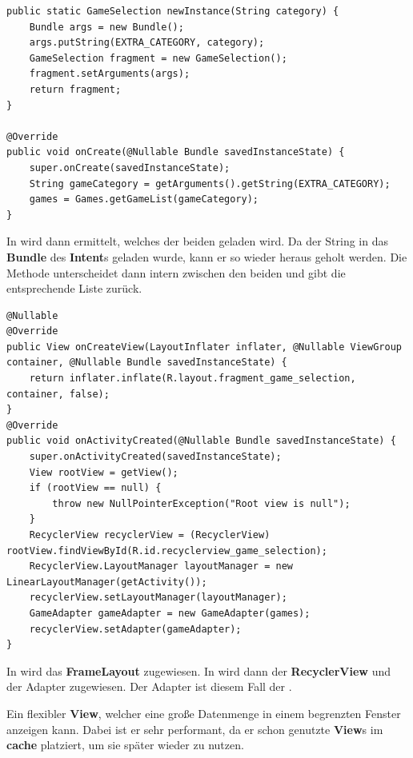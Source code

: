 \begin{lstlisting}[caption={Hub setupNavigationView() Methode},captionpos=b]
public static GameSelection newInstance(String category) {
	Bundle args = new Bundle();
	args.putString(EXTRA_CATEGORY, category);	
	GameSelection fragment = new GameSelection();
	fragment.setArguments(args);
	return fragment;
}

@Override
public void onCreate(@Nullable Bundle savedInstanceState) {
	super.onCreate(savedInstanceState);
	String gameCategory = getArguments().getString(EXTRA_CATEGORY);
	games = Games.getGameList(gameCategory);
}
\end{lstlisting}

In  wird dann ermittelt, welches der beiden geladen wird.
Da der String in das \textbf{Bundle} des \textbf{Intent}s geladen wurde, kann
er so wieder heraus geholt werden. Die Methode 
unterscheidet dann intern zwischen den beiden und gibt die entsprechende Liste
zurück.\\

\begin{lstlisting}[caption={GameSelection onCreateView() \& onActivityCreated() Methode},
captionpos=b]
@Nullable
@Override
public View onCreateView(LayoutInflater inflater, @Nullable ViewGroup container, @Nullable Bundle savedInstanceState) {
	return inflater.inflate(R.layout.fragment_game_selection, container, false);
}
@Override
public void onActivityCreated(@Nullable Bundle savedInstanceState) {
	super.onActivityCreated(savedInstanceState);
	View rootView = getView();
	if (rootView == null) {
		throw new NullPointerException("Root view is null");
	}
	RecyclerView recyclerView = (RecyclerView) rootView.findViewById(R.id.recyclerview_game_selection);
	RecyclerView.LayoutManager layoutManager = new LinearLayoutManager(getActivity());
	recyclerView.setLayoutManager(layoutManager);
	GameAdapter gameAdapter = new GameAdapter(games);
	recyclerView.setAdapter(gameAdapter);
}
\end{lstlisting}

In  wird das \textbf{FrameLayout} zugewiesen. In
 wird dann der \textbf{RecyclerView} und der
Adapter zugewiesen. Der Adapter ist diesem Fall der .

\begin{infobox}[frametitle=RecyclerView]
Ein flexibler \textbf{View}, welcher eine große Datenmenge in einem begrenzten
Fenster anzeigen kann. Dabei ist er sehr performant, da er schon genutzte
\textbf{View}s im \textbf{cache} platziert, um sie später wieder zu nutzen. 
\end{infobox}

